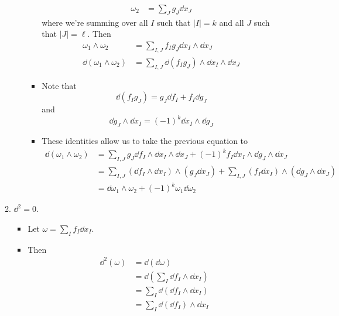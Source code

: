 \documentclass[../notes.tex]{subfiles}
\begin{document}
\begin{itemize}
\begin{enumerate}
\begin{itemize}
\begin{itemize}
\begin{align*}
                    \omega_2 &= \sum_Jg_J\dd{x_J}
                \end{align*}
                where we're summing over all $I$ such that $|I|=k$ and all $J$ such that $|J|=\ell$. Then
                \begin{align*}
                    \omega_1\wedge\omega_2 &= \sum_{I,J}f_Ig_J\dd{x_I}\wedge\dd{x_J}\\
                    \dd{(\omega_1\wedge\omega_2)} &= \sum_{I,J}\dd{(f_Ig_J)}\wedge\dd{x_I}\wedge\dd{x_J}
                \end{align*}
                \item Note that
                \begin{equation*}
                    \dd{(f_Ig_J)} = g_J\dd{f_I}+f_I\dd{g_J}
                \end{equation*}
                and
                \begin{equation*}
                    \dd{g_J}\wedge\dd{x_I} = (-1)^k\dd{x_I}\wedge\dd{g_J}
                \end{equation*}
                \item These identities allow us to take the previous equation to
                \begin{align*}
                    \dd{(\omega_1\wedge\omega_2)} &= \sum_{I,J}g_J\dd{f_I}\wedge\dd{x_I}\wedge\dd{x_J}+(-1)^kf_I\dd{x_I}\wedge\dd{g_J}\wedge\dd{x_J}\\
                    &= \sum_{I,J}(\dd{f_I}\wedge\dd{x_I})\wedge(g_J\dd{x_J})+\sum_{I,J}(f_I\dd{x_I})\wedge(\dd{g_J}\wedge\dd{x_J})\\
                    &= \dd{\omega_1}\wedge\omega_2+(-1)^k\omega_1\dd{\omega_2}
                \end{align*}
            \end{itemize}
        \end{itemize}
        \item $\dd^2=0$.
        \begin{itemize}
            \item Let $\omega=\sum_If_I\dd{x_I}$.
            \item Then
            \begin{align*}
                \dd^2(\omega) &= \dd(\dd{\omega})\\
                &= \dd(\sum_I\dd{f_I}\wedge\dd{x_I})\\
                &= \sum_I\dd(\dd{f_I}\wedge\dd{x_I})\tag*{Property 1}\\
                &= \sum_I\dd(\dd{f_I})\wedge\dd{x_I}\tag*{Property 2}

\end{align*}
\end{itemize}
\end{enumerate}
\end{itemize}
\end{document}
